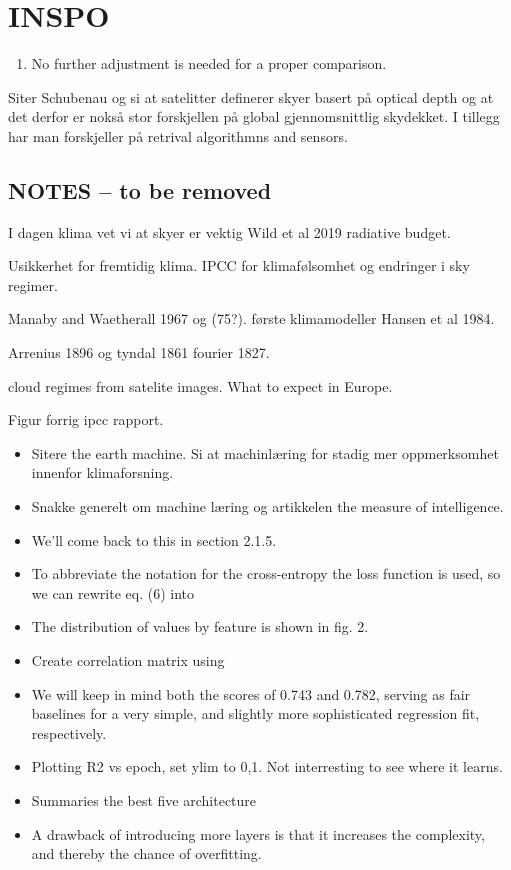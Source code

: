 \section{INSPO}
\begin{enumerate}
    \item No further adjustment is needed for a proper comparison.
\end{enumerate}

Siter Schubenau og si at satelitter definerer skyer basert på optical depth og at det derfor er nokså stor forskjellen på global gjennomsnittlig skydekket. I tillegg har man forskjeller på retrival algorithmns and sensors. 

\subsection{NOTES -- to be removed}
I dagen klima vet vi at skyer er vektig
Wild et al 2019 radiative budget.

Usikkerhet for fremtidig klima.
IPCC for klimafølsomhet og endringer i sky regimer. 

Manaby and Waetherall 1967 og (75?). første klimamodeller 
Hansen et al 1984.

Arrenius 1896 og tyndal 1861 fourier 1827.

cloud regimes from satelite images. What to expect in Europe. 

Figur forrig ipcc rapport. 

\begin{itemize}
    \item Sitere the earth machine. Si at machinlæring for stadig mer oppmerksomhet innenfor klimaforsning. 
    \item Snakke generelt om machine læring og artikkelen the measure of intelligence. 
    \item We’ll come back to this in
section 2.1.5.
\item To abbreviate the notation for the cross-entropy the loss function is used, so we can rewrite eq. (6) into
\item The distribution of values
by feature is shown in fig. 2.
\item Create correlation matrix using 
\item We will keep in mind both the scores of 0.743 and 0.782, serving
as fair baselines for a very simple, and slightly more sophisticated
regression fit, respectively.
\item Plotting R2 vs epoch, set ylim to 0,1. Not interresting to see where it learns.
\item Summaries the best five architecture 
\item A drawback of introducing more layers
is that it increases the complexity, and thereby the chance of
overfitting.

\end{itemize}